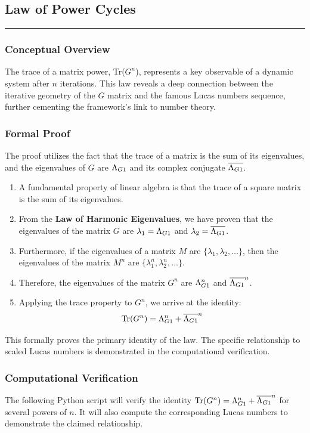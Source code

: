 \subsection*{Law of Power Cycles}
\hrule
\vspace{0.3cm}
\vspace{0.5cm}

\subsubsection*{Conceptual Overview}
The trace of a matrix power, Tr($G^n$), represents a key observable of a dynamic system after $n$ iterations. This law reveals a deep connection between the iterative geometry of the $G$ matrix and the famous Lucas numbers sequence, further cementing the framework's link to number theory.

\subsubsection*{Formal Proof}
The proof utilizes the fact that the trace of a matrix is the sum of its eigenvalues, and the eigenvalues of $G$ are $\Lambda_{G1}$ and its complex conjugate $\overline{\Lambda_{G1}}$.

\begin{enumerate}
    \item A fundamental property of linear algebra is that the trace of a square matrix is the sum of its eigenvalues.
    \item From the \textbf{Law of Harmonic Eigenvalues}, we have proven that the eigenvalues of the matrix $G$ are $\lambda_1 = \Lambda_{G1}$ and $\lambda_2 = \overline{\Lambda_{G1}}$.
    \item Furthermore, if the eigenvalues of a matrix $M$ are $\{\lambda_1, \lambda_2, \dots\}$, then the eigenvalues of the matrix $M^n$ are $\{\lambda_1^n, \lambda_2^n, \dots\}$.
    \item Therefore, the eigenvalues of the matrix $G^n$ are $\Lambda_{G1}^n$ and $\overline{\Lambda_{G1}}^n$.
    \item Applying the trace property to $G^n$, we arrive at the identity:
    $$ \text{Tr}(G^n) = \Lambda_{G1}^n + \overline{\Lambda_{G1}}^n $$
\end{enumerate}
This formally proves the primary identity of the law. The specific relationship to scaled Lucas numbers is demonstrated in the computational verification.

\subsubsection*{Computational Verification}
The following Python script will verify the identity $\text{Tr}(G^n) = \Lambda_{G1}^n + \overline{\Lambda_{G1}}^n$ for several powers of $n$. It will also compute the corresponding Lucas numbers to demonstrate the claimed relationship.

